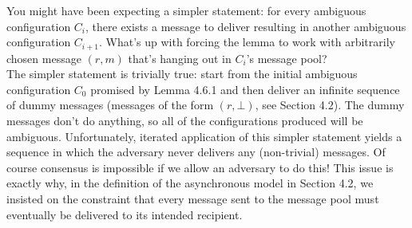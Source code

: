 You might have been expecting a simpler statement: for every ambiguous configuration $C_i$, there exists a message to deliver resulting in another ambiguous configuration $C_{i+1}$. What’s up with forcing the lemma to work with arbitrarily chosen message $(r, m)$ that’s hanging out in $C_i$’s message pool?\\
The simpler statement is trivially true: start from the initial ambiguous configuration $C_0$
promised by Lemma 4.6.1 and then deliver an infinite sequence of dummy messages (messages of the form $(r, \bot)$, see Section 4.2). The dummy messages don’t do anything, so all of the configurations produced will be ambiguous. Unfortunately, iterated application of this
simpler statement yields a sequence in which the adversary never delivers any (non-trivial)
messages. Of course consensus is impossible if we allow an adversary to do this! This issue
is exactly why, in the definition of the asynchronous model in Section 4.2, we insisted on the constraint that every message sent to the message pool must eventually be delivered to its intended recipient.\\

